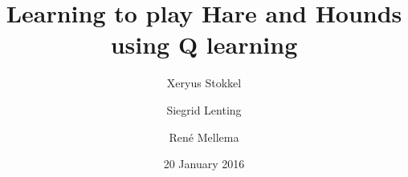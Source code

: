 \documentclass{beamer}
\title{Learning to play Hare and Hounds using Q learning}
\author{Xeryus Stokkel \and Siegrid Lenting \and Ren\'e Mellema}
\date{20 January 2016}
\begin{document}
\begin{frame}
    \maketitle
\end{frame}




\end{document}

